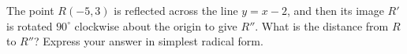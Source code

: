 The point $R(-5,3)$ is reflected across the line $y=x-2$, and then its image $R'$ is rotated $90^\circ$ clockwise about the origin to give $R''$. What is the distance from $R$ to $R''$? Express your answer in simplest radical form.
